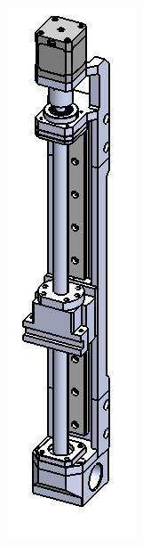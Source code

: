 \begin{enumerate}
\begin{figure}
    \centering
    \includegraphics[scale=0.6]{Platforms/figs/yaxis8.png}
    \caption{\label{fig:yaxis8}}
\end{figure}
 
\end{enumerate}


